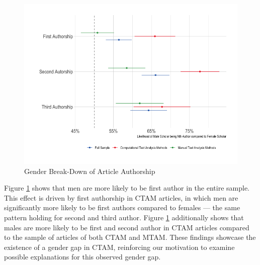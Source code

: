 \documentclass[
]{ccr}
\begin{document}
\begin{figure}[t]

{\centering \includegraphics[width=1\textwidth,height=\textheight]{figures/ttest-1.png}

}

\caption{\label{fig:ttest}Gender Break-Down of Article Authorship}

\end{figure}

Figure \ref{fig:ttest} shows that men are more likely to be first author
in the entire sample. This effect is driven by first authorship in CTAM
articles, in which men are significantly more likely to be first authors
compared to females --- the same pattern holding for second and third
author. Figure \ref{fig:ttest} additionally shows that males are more
likely to be first and second author in CTAM articles compared to the
sample of articles of both CTAM and MTAM. These findings showcase the
existence of a gender gap in CTAM, reinforcing our motivation to examine
possible explanations for this observed gender gap.
\end{document}
